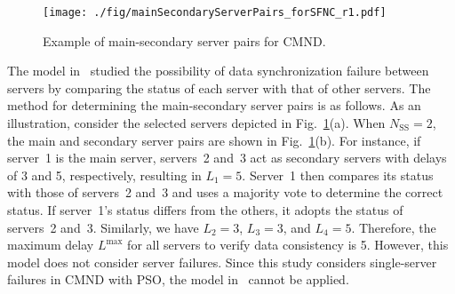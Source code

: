 \documentclass[10pt, letterpaper]{IEEEtran}
\begin{document}
\begin{CJK}{UTF8}{ipxm}
\begin{figure}[tb]
  \begin{center}
    \texttt{[image: ./fig/mainSecondaryServerPairs\_forSFNC\_r1.pdf]}
  \end{center}
  \caption{Example of main-secondary server pairs for CMND.}
  \label{fig:mainSecondaryServerPairs}
\end{figure}

The model in~\cite{KawabataICC2023,CMND} studied the possibility of data synchronization failure between servers 
by comparing the status of each server with that of other servers.
The method for determining the main-secondary server pairs is as follows.
As an illustration, consider the selected servers depicted in Fig.~\ref{fig:mainSecondaryServerPairs}(a). When $N_{\mathrm{SS}}=2$, the main and secondary server pairs are shown in Fig.~\ref{fig:mainSecondaryServerPairs}(b). 
For instance, if server~1 is the main server, servers~2 and~3 act as secondary servers with delays of 3 and 5, respectively, resulting in $L_1=5$. 
Server~1 then compares its status with those of servers~2 and~3 and uses a majority vote to determine the correct status. 
If server~1's status differs from the others, it adopts the status of servers~2 and~3. 
Similarly, we have $L_2=3$, $L_3=3$, and $L_4=5$.
Therefore, the maximum delay $L^{\max}$ for all servers to verify data consistency is 5.
  However, this model does not consider server failures.
  Since this study considers single-server failures in CMND with PSO, the model in~\cite{KawabataICC2023,CMND} cannot be applied.


\end{CJK}
\end{document}
